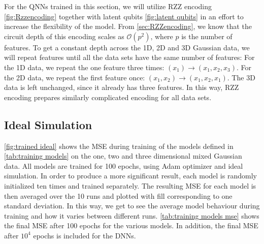 For the QNNs trained in this section, we will utilize RZZ encoding \cref{fig:Rzzencoding} together with latent qubits \cref{fig:latent qubits} in an effort to increase the flexibility of the model. From \cref{sec:RZZencoding}, we know that the circuit depth of this encoding scales as $\mathcal{O}(p^2)$, where $p$ is the number of features. To get a constant depth across the 1D, 2D and 3D Gaussian data, we will repeat features until all the data sets have the same number of features: For the 1D data, we repeat the one feature three times: $(x_1) \rightarrow (x_1, x_2, x_3)$. For the 2D data, we repeat the first feature once: $(x_1, x_2) \rightarrow (x_1, x_2, x_1)$. The 3D data is left unchanged, since it already has three features. In this way, RZZ encoding prepares similarly complicated encoding for all data sets.


\subsection{Ideal Simulation}\label{sec:Ideal Simulation}
\cref{fig:trained ideal} shows the MSE during training of the models defined in \cref{tab:training models} on the one, two and three dimensional mixed Gaussian data. All models are trained for 100 epochs, using Adam optimizer and ideal simulation. In order to produce a more significant result, each model is randomly initialized ten times and trained separately. The resulting MSE for each model is then averaged over the 10 runs and plotted with fill corresponding to one standard deviation. In this way, we get to see the average model behaviour during training and how it varies between different runs. \cref{tab:training models mse} shows the final MSE after 100 epochs for the various models. In addition, the final MSE after $10^4$ epochs is included for the DNNs.   

